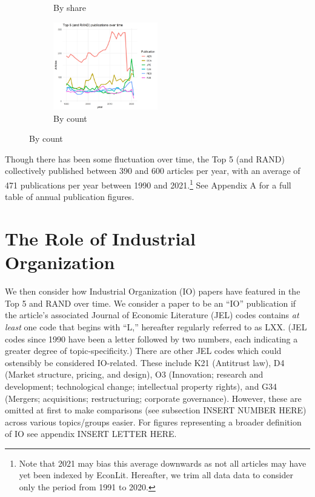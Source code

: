\documentclass[11pt, letterpaper, twoside]{article}
\begin{document}
\begin{figure}[h]
\begin{subfigure}[h]{0.49\textwidth}
        \caption{By share}
    \end{subfigure}
    \begin{subfigure}[h]{\textwidth}
        \centering
        \includegraphics[width=0.5\textwidth]{top5_over_time.png}
        \caption{By count}
    \end{subfigure}
\end{figure}

Though there has been some fluctuation over time, the Top 5 (and RAND) collectively published between 390 and 600 articles per year, with an average of 471 publications per year between 1990 and 2021.\footnote{Note that 2021 may bias this average downwards as not all articles may have yet been indexed by EconLit. Hereafter, we trim all data data to consider only the period from 1991 to 2020.} See Appendix A for a full table of annual publication figures.




\section{The Role of Industrial Organization}
We then consider how Industrial Organization (IO) papers have featured in the Top 5 and RAND over time. We consider a paper to be an ``IO'' publication if the article's associated Journal of Economic Literature (JEL) codes contains \textit{at least} one code that begins with ``L,'' hereafter regularly referred to as LXX. (JEL codes since 1990 have been a letter followed by two numbers, each indicating a greater degree of topic-specificity.) There are other JEL codes which could ostensibly be considered IO-related. These include K21 (Antitrust law), D4 (Market structure, pricing, and design), O3 (Innovation; research and development; technological change; intellectual property rights), and G34 (Mergers; acquisitions; restructuring; corporate governance). However, these are omitted at first to make comparisons (see subsection INSERT NUMBER HERE) across various topics/groups easier. For figures representing a broader definition of IO see appendix INSERT LETTER HERE.\\
\end{document}
